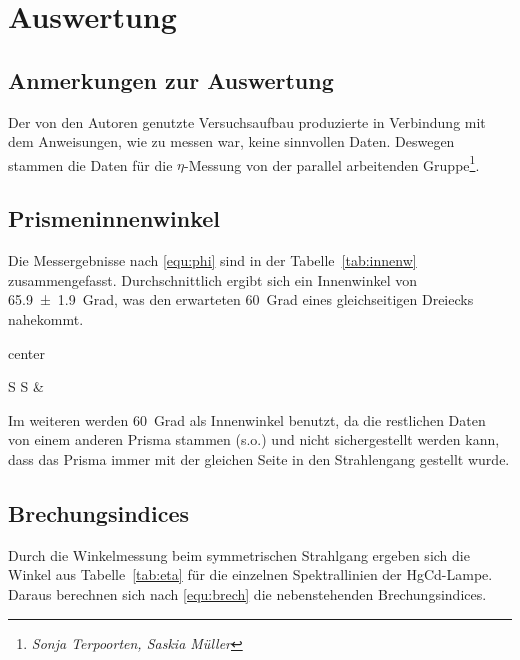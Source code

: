 \section{Auswertung}
\label{sec:Auswertung}

\subsection{Anmerkungen zur Auswertung} %
\label{sub:anmerkungen_zur_auswertung}
	Der von den Autoren genutzte Versuchsaufbau produzierte in Verbindung mit dem Anweisungen, wie zu messen war, keine sinnvollen Daten. Deswegen stammen die Daten für die $\eta$-Messung von der parallel arbeitenden Gruppe\footnote{\emph{Sonja Terpoorten, Saskia Müller}}.


\subsection{Prismeninnenwinkel}
\label{sub:prismeninnenwinkel}
	Die Messergebnisse nach \ref{equ:phi} sind in der Tabelle~\ref{tab:innenw} zusammengefasst. Durchschnittlich ergibt sich ein Innenwinkel von \num{65.9+-1.9}~Grad, was den erwarteten 60~Grad eines gleichseitigen Dreiecks nahekommt.

	\begin{table}[H]
    \centering
    \caption{Messung des Prismeninnenwinkels.}
    \label{tab:innenw}
    \begin{adjustbox}{center}
    \begin{tabular}{
        S
        S}
     \toprule
      &
      \\
     \midrule
     \bottomrule
    \end{tabular}
    \end{adjustbox}
	\end{table}

	Im weiteren werden 60~Grad als Innenwinkel benutzt, da die restlichen Daten von einem anderen Prisma stammen (s.o.) und nicht sichergestellt werden kann, dass das Prisma immer mit der gleichen Seite in den Strahlengang gestellt wurde.


\subsection{Brechungsindices}
\label{sub:brechungsindices}
	Durch die Winkelmessung beim symmetrischen Strahlgang ergeben sich die Winkel aus Tabelle~\ref{tab:eta} für die einzelnen Spektrallinien der HgCd-Lampe. Daraus berechnen sich nach \ref{equ:brech} die nebenstehenden Brechungsindices.\\

